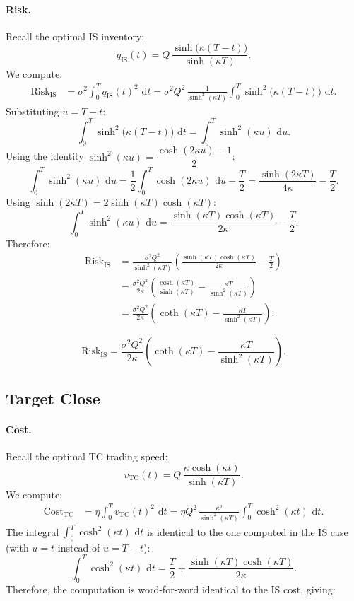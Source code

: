\documentclass[12pt, a4paper]{article}
\newcommand{\dd}{\,\mathrm{d}}
\newcommand{\kap}{\kappa}
\begin{document}
\paragraph{Risk.}
Recall the optimal IS inventory:
\[
  q_{\mathrm{IS}}(t) = Q\,\frac{\sinh\!\bigl(\kap(T-t)\bigr)}{\sinh(\kap T)}.
\]
We compute:
\begin{align*}
  \mathrm{Risk}_{\mathrm{IS}}
  &= \sigma^2\int_0^T q_{\mathrm{IS}}(t)^2\,\dd t
   = \sigma^2 Q^2\,\frac{1}{\sinh^2(\kap T)}\int_0^T \sinh^2\!\bigl(\kap(T-t)\bigr)\,\dd t.
\end{align*}
Substituting $u = T - t$:
\[
  \int_0^T \sinh^2\!\bigl(\kap(T-t)\bigr)\,\dd t
  = \int_0^T \sinh^2(\kap u)\,\dd u.
\]
Using the identity $\sinh^2(\kap u) = \dfrac{\cosh(2\kap u) - 1}{2}$:
\[
  \int_0^T \sinh^2(\kap u)\,\dd u
  = \frac{1}{2}\int_0^T \cosh(2\kap u)\,\dd u - \frac{T}{2}
  = \frac{\sinh(2\kap T)}{4\kap} - \frac{T}{2}.
\]
Using $\sinh(2\kap T) = 2\sinh(\kap T)\cosh(\kap T)$:
\[
  \int_0^T \sinh^2(\kap u)\,\dd u
  = \frac{\sinh(\kap T)\cosh(\kap T)}{2\kap} - \frac{T}{2}.
\]
Therefore:
\begin{align*}
  \mathrm{Risk}_{\mathrm{IS}}
  &= \frac{\sigma^2 Q^2}{\sinh^2(\kap T)}
     \left(\frac{\sinh(\kap T)\cosh(\kap T)}{2\kap} - \frac{T}{2}\right) \\
  &= \frac{\sigma^2 Q^2}{2\kap}
     \left(\frac{\cosh(\kap T)}{\sinh(\kap T)} - \frac{\kap T}{\sinh^2(\kap T)}\right) \\
  &= \frac{\sigma^2 Q^2}{2\kap}
     \left(\coth(\kap T) - \frac{\kap T}{\sinh^2(\kap T)}\right).
\end{align*}

\begin{resultbox}
\[
  \mathrm{Risk}_{\mathrm{IS}}
  = \frac{\sigma^2 Q^2}{2\kap}
    \left(\coth(\kap T) - \frac{\kap T}{\sinh^2(\kap T)}\right).
\]
\end{resultbox}

\subsection{Target Close}

\paragraph{Cost.}
Recall the optimal TC trading speed:
\[
  v_{\mathrm{TC}}(t) = Q\,\frac{\kap\cosh(\kap t)}{\sinh(\kap T)}.
\]
We compute:
\begin{align*}
  \mathrm{Cost}_{\mathrm{TC}}
  &= \eta\int_0^T v_{\mathrm{TC}}(t)^2\,\dd t
   = \eta Q^2\,\frac{\kap^2}{\sinh^2(\kap T)}\int_0^T \cosh^2(\kap t)\,\dd t.
\end{align*}
The integral $\int_0^T \cosh^2(\kap t)\,\dd t$ is identical to the one computed in the IS
case (with $u = t$ instead of $u = T-t$):
\[
  \int_0^T \cosh^2(\kap t)\,\dd t
  = \frac{T}{2} + \frac{\sinh(\kap T)\cosh(\kap T)}{2\kap}.
\]
Therefore, the computation is word-for-word identical to the IS cost, giving:
\end{document}
